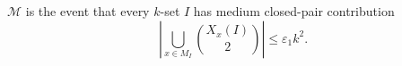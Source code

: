 \begin{definition}
\(\mathcal M\) is the event that every \(k\)-set \(I\) has medium closed-pair
contribution
\[
\left|\bigcup_{x\in M_I}\binom{X_x(I)}2\right|\le \varepsilon_1k^2.
\]
\end{definition}
